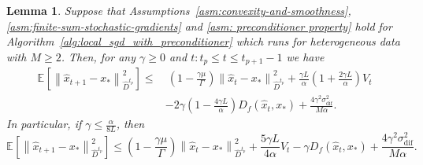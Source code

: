 \documentclass[sn-mathphys,Numbered]{sn-jnl}%
\newtheorem{lemma}{Lemma}%
\renewcommand{\|}{\parallel}
\newcommand\ec[2][]{\ensuremath{\mathbb{E}_{#1} \left[#2\right]}}
\newcommand\ecn[3][]{\ec[#1]{\norm{#2}^2_{#3}}}
\newcommand\br[1]{\left ( #1 \right )}
\newcommand{\norm}[1]{\left\lVert#1\right\rVert}
\newcommand{\sqn}[1]{{\left\lVert#1\right\rVert}^2}
\newcommand{\sigmaf}{\sigma_{\mathrm{dif}}}
\renewcommand {\*} {\ast}
\begin{document}
\begin{lemma} 
    \label{lemma:optimality-gap-single-recursion}
    Suppose that Assumptions~\ref{asm:convexity-and-smoothness},  \ref{asm:finite-sum-stochastic-gradients} and \ref{asm: preconditioner property} hold for Algorithm~\ref{alg:local_sgd_with_preconditioner} which runs for heterogeneous data with $M \geq 2$. Then, for any $\gamma \geq 0$ and $t: t_p \leq t \leq t_{p+1} - 1$ we have
    \begin{align*}
        \label{eq:9f8gff}
        \ecn{\hat{x}_{t+1} - x_\ast}{\hat{D}^{t_p}}\leq&\
        \br{1 - \frac{\gamma \mu}{\Gamma}} \sqn{\hat{x}_{t} - x_\ast}_{\hat{D}^{t_p}} + \frac{\gamma L}{\alpha} \br{1 + \frac{2\gamma L}{\alpha}} V_t \\ &- 2 \gamma \br{1 - \frac{4\gamma L}{\alpha}} D_{f} (\hat{x}_t, x_\ast) + \frac{4 \gamma^2 \sigmaf^2}{M\alpha}.
    \end{align*}   
    In particular, if $\gamma \leq \frac{\alpha}{8L}$, then
    \begin{equation}
        \ecn{\hat{x}_{t+1} - x_\ast}{\hat{D}^{t_p}} \leq \br{1 - \frac{\gamma \mu}{\Gamma}} \sqn{\hat{x}_{t} - x_\ast}_{\hat{D}^{t_p}} + \frac{5\gamma L}{4\alpha} V_t - \gamma D_{f} (\hat{x}_t, x_\ast) + \frac{4 \gamma^2 \sigmaf^2}{M\alpha} \nonumber.
    \end{equation}
\end{lemma}
\end{document}
